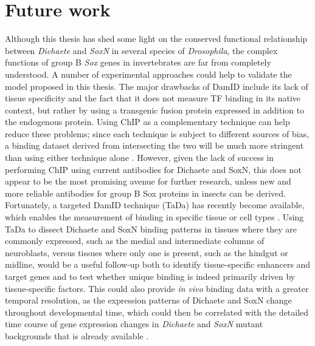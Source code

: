 \section{Future work}
Although this thesis has shed some light on the conserved functional relationship between \emph{Dichaete} and \emph{SoxN} in several species of \emph{Drosophila}, the complex functions of group B \emph{Sox} genes in invertebrates are far from completely understood. A number of experimental approaches could help to validate the model proposed in this thesis. The major drawbacks of DamID include its lack of tissue specificity and the fact that it does not measure TF binding in its native context, but rather by using a transgenic fusion protein expressed in addition to the endogenous protein. Using ChIP as a complementary technique can help reduce these problems; since each technique is subject to different sources of bias, a binding dataset derived from intersecting the two will be much more stringent than using either technique alone \citep{aleksic_role_2013}. However, given the lack of success in performing ChIP using current antibodies for Dichaete and SoxN, this does not appear to be the most promising avenue for further research, unless new and more reliable antibodies for group B Sox proteins in insects can be derived. Fortunately, a targeted DamID technique (TaDa) has recently become available, which enables the measurement of binding in specific tissue or cell types \citep{southall_cell-type-specific_2013}. Using TaDa to dissect Dichaete and SoxN binding patterns in tissues where they are commonly expressed, such as the medial and intermediate columns of neuroblasts, versus tissues where only one is present, such as the hindgut or midline, would be a useful follow-up both to identify tissue-specific enhancers and target genes and to test whether unique binding is indeed primarily driven by tissue-specific factors. This could also provide \emph{in vivo} binding data with a greater temporal resolution, as the expression patterns of Dichaete and SoxN change throughout developmental time, which could then be correlated with the detailed time course of gene expression changes in \emph{Dichaete} and \emph{SoxN} mutant backgrounds that is already available \citep{ferrero_soxneuro_2014}.

